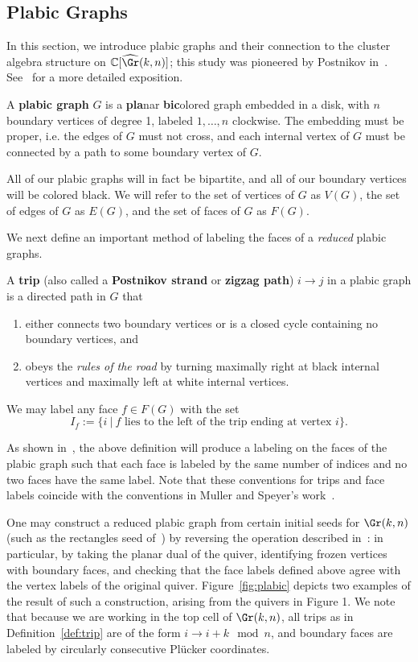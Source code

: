 \subsection{Plabic Graphs}
\label{subsection: plabic}
In this section, we introduce plabic graphs and their connection to the cluster algebra structure on $\mathbb{C}[\widehat{\Gr}(k,n)]$; this study was pioneered by Postnikov in~\cite{p06}. See~\cite{fwz-ch7} for a more detailed exposition.

\begin{defi}
A \textbf{plabic graph} $G$ is a \textbf{pla}nar \textbf{bic}olored graph embedded in a disk, with $n$ boundary vertices of degree 1, labeled $1,\dots, n$ clockwise. The embedding must be proper, i.e. the edges of $G$ must not cross, and each internal vertex of $G$ must be connected by a path to some boundary vertex of $G$.

All of our plabic graphs will in fact be bipartite, and all of our boundary vertices will be colored black. We will refer to the set of vertices of $G$ as $V(G)$, the set of edges of $G$ as $E(G)$, and the set of faces of $G$ as $F(G)$.
\end{defi}

We next define an important method of labeling the faces of a \textit{reduced} plabic graphs.
\begin{defi} \label{def:trip}
A \textbf{trip} (also called a \textbf{Postnikov strand} or \textbf{zigzag path}) $i \to j$ in a plabic graph is a directed path in $G$ that 
\begin{enumerate}
\item either connects two boundary vertices or is a closed cycle containing no boundary vertices, and
\item obeys the \textit{rules of the road} by turning maximally right at black internal vertices and maximally left at white internal vertices.
\end{enumerate}
We may label any face $f \in F(G)$ with the set
\[I_f:=\{i~|~f \text{ lies to the left of the trip ending at vertex }i\}.\]
\end{defi}
As shown in~\cite{p06}, the above definition will produce a labeling on the faces of the plabic graph such that each face is labeled by the same number of indices and no two faces have the same label. Note that these conventions for trips and face labels coincide with the conventions in Muller and Speyer's work~\cite{mullerspeyer}.

One may construct a reduced plabic graph from certain initial seeds for $\Gr(k,n)$ (such as the rectangles seed of~\cite{fwz-ch6}) by reversing the operation described in~\cite[Definition~7.1.4]{fwz-ch7}: in particular, by taking the planar dual of the quiver, identifying frozen vertices with boundary faces, and checking that the face labels defined above agree with the vertex labels of the original quiver. Figure~\ref{fig:plabic} depicts two examples of the result of such a construction, arising from the quivers in Figure 1.
We note that because we are working in the top cell of $\Gr(k,n)$, all trips as in Definition~\ref{def:trip} are of the form $i\to i+k \mod n$, and boundary faces are labeled by circularly consecutive Pl\"ucker coordinates.

